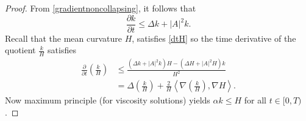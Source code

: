 \begin{proof}
    From \cref{gradientnoncollapsing}, it follows that 
    \[ \frac{\partial k}{ \partial t} \le \Delta k + |A|^{2}k.\]
    Recall that the mean curvature $ H $, satisfies \cref{dtH} so the time derivative of the quotient $ \frac{k}{H} $ satisfies \begin{align*}
        \frac{\partial }{\partial t}\left( \frac{k}{H} \right)  & \le \frac{(\Delta k+|A|^{2}k)H - (\Delta H + |A|^{2}H)k}{H^{2}} \\
        & = \Delta \left( \frac{k}{H} \right) + \frac{2}{H}\left< \nabla \left( \frac{k}{H} \right), \nabla H \right>.
    \end{align*}
    Now maximum principle (for viscosity solutions) yields $ \alpha k \le H  $ for all $ t \in [0,T) $. 
\end{proof}